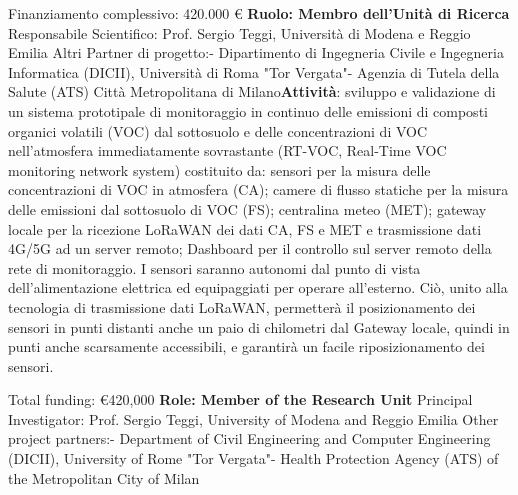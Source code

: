         
{\newline
Finanziamento complessivo: 420.000 €\newline
\textbf{Ruolo: Membro dell'Unità di Ricerca}\newline
Responsabile Scientifico: Prof. Sergio Teggi, Università di Modena e Reggio Emilia\newline
Altri Partner di progetto:\newline{}- Dipartimento di Ingegneria Civile e Ingegneria Informatica (DICII), Università
di Roma "Tor Vergata"\newline{}- Agenzia di Tutela della Salute (ATS) Città Metropolitana di Milano}{\textbf{Attività}: sviluppo e validazione di un sistema prototipale di monitoraggio in continuo delle emissioni di composti organici volatili (VOC) dal sottosuolo e delle concentrazioni di VOC nell’atmosfera immediatamente sovrastante (RT-VOC, Real-Time VOC monitoring network system) costituito da: sensori per la misura delle concentrazioni di VOC in atmosfera (CA); camere di flusso
statiche per la misura delle emissioni dal sottosuolo di VOC (FS); centralina meteo (MET);
gateway locale per la ricezione LoRaWAN dei dati CA, FS e MET e trasmissione dati 4G/5G ad un
server remoto; Dashboard per il controllo sul server remoto della rete di monitoraggio. I sensori saranno autonomi dal punto di vista dell’alimentazione elettrica ed equipaggiati per operare all’esterno. Ciò, unito alla tecnologia di trasmissione dati LoRaWAN, permetterà il posizionamento dei sensori in punti distanti anche un paio di chilometri dal Gateway locale, quindi in punti anche scarsamente accessibili, e garantirà un facile riposizionamento dei sensori.}

{\newline
Total funding: €420,000\newline
\textbf{Role: Member of the Research Unit}\newline
Principal Investigator: Prof. Sergio Teggi, University of Modena and Reggio Emilia\newline
Other project partners:\newline{}- Department of Civil Engineering and Computer Engineering (DICII), University of Rome "Tor Vergata"\newline{}- Health Protection Agency (ATS) of the Metropolitan City of Milan}{}

